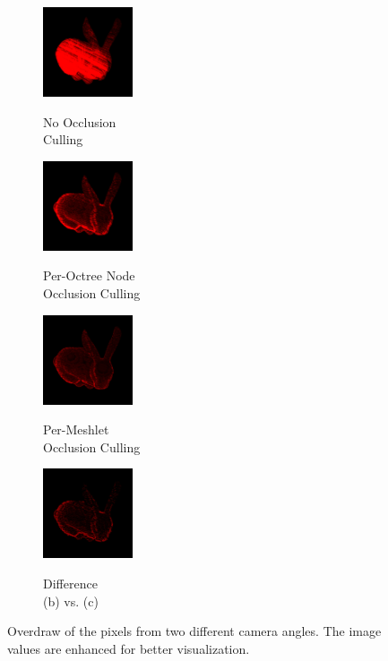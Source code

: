 \begin{figure}[!htb]
  \begin{subfigure}{100px}
    \includegraphics[width=100px]{images/graphics/overdraw-bunny2-nocull.png}
    \caption{}
    \parbox{\linewidth}{\centering\footnotesize No Occlusion\\Culling}
  \end{subfigure}
  \begin{subfigure}{100px}
    \includegraphics[width=100px]{images/graphics/overdraw-bunny2-pooc.png}
    \caption{}
    \parbox{\linewidth}{\centering\footnotesize Per-Octree Node\\Occlusion Culling}
  \end{subfigure}
  \begin{subfigure}{100px}
    \includegraphics[width=100px]{images/graphics/overdraw-bunny2-pmoc.png}
    \caption{}
    \parbox{\linewidth}{\centering\footnotesize Per-Meshlet\\Occlusion Culling}
  \end{subfigure}
  \begin{subfigure}{100px}
    \includegraphics[width=100px]{images/graphics/overdraw-bunny2-diff.png}
    \caption{}
    \parbox{\linewidth}{\centering\footnotesize Difference\\(b) vs. (c)}
  \end{subfigure}

  \caption{Overdraw of the pixels from two different camera angles. 
  The image values are enhanced for better visualization.}
  \label{fig:bunny-overdraw}
\end{figure}

